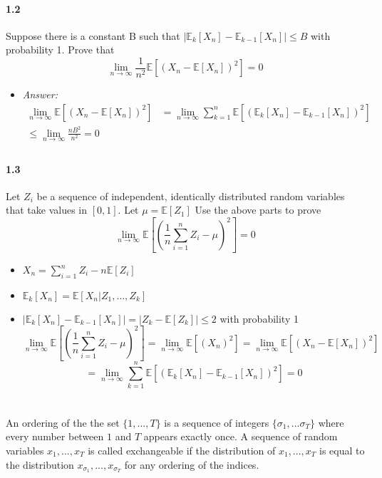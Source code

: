 \documentclass[a4paper]{article}
\begin{document}
\paragraph{1.2}
Suppose there is a constant B such that $|\mathbb{E}_k [X_n ] - \mathbb{E}_{k-1} [X_n ]| \leq B$ with probability 1.
Prove that
$$\lim_{n \rightarrow \infty} \frac{1}{n^2} \mathbb{E}[(X_n - \mathbb{E}[X_n ])^2 ] = 0$$

\begin{itemize}
    \item \emph{Answer:}
    \begin{align*}
        \lim_{n \rightarrow \infty}\mathbb{E}\!\left[(X_n - \mathbb{E}[X_n])^2\right]
        &= \lim_{n \rightarrow \infty}\sum_{k=1}^n \mathbb{E}[(\mathbb{E}_k [X_n ] - \mathbb{E}_{k-1} [X_n ])^2] \\
        \leq \lim_{n \rightarrow \infty}\frac{nB^2}{n^2} = 0 \\
    \end{align*}
\end{itemize}

\paragraph{1.3}
Let $Z_i$ be a sequence of independent, identically distributed random variables that take values in $[0, 1]$.
Let $\mu = \mathbb{E}[Z_1 ]$ Use the above parts to prove
$$\lim_{n \rightarrow \infty} \mathbb{E}\left[\left(\frac{1}{n} \sum_{i=1}^n Z_i - \mu\right)^2\right]  = 0$$

\begin{itemize}
    \item $X_n =  \sum_{i = 1}^n Z_i - n \mathbb{E}[Z_i]$
    \item $\mathbb{E}_k[X_n] = \mathbb{E}[X_n|Z_1, \dots, Z_k]$
    \item $|\mathbb{E}_k[X_n] - \mathbb{E}_{k-1}[X_n]| = |Z_k - \mathbb{E}[Z_k]|\leq 2$ with probability 1
$$\lim_{n \rightarrow \infty} \mathbb{E}\left[\left(\frac{1}{n} \sum_{i=1}^n Z_i - \mu\right)^2\right] = \lim_{n \rightarrow \infty} \mathbb{E}[(X_n)^2] 
= \lim_{n \rightarrow \infty}\mathbb{E}[(X_n - \mathbb{E}[X_n])^2]$$
$$= \lim_{n \rightarrow \infty}\sum_{k=1}^n \mathbb{E}[(\mathbb{E}_k [X_n ] - \mathbb{E}_{k-1} [X_n ])^2]=0$$
\end{itemize}
\section{}
An ordering of the the set $\{1, . . . , T \}$ is a sequence of integers $\{\sigma_1 , . . . \sigma_T \}$ where every number between $1$ and $T$ appears exactly once.
A sequence of random variables $x_1 , . . . , x_T$ is called exchangeable if the distribution of $x_1 , . . . , x_T$ is equal to the distribution $x_{\sigma_1}, . . . , x_{\sigma_T}$ for any ordering of the indices.
\end{document}
